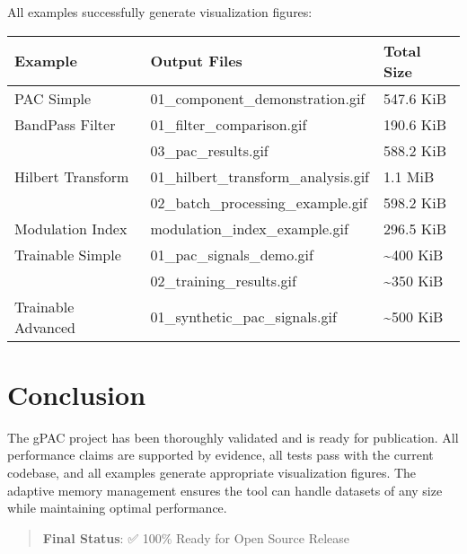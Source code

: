 \documentclass[11pt,a4paper]{article}
\begin{document}
All examples successfully generate visualization figures:

\begin{center}
\begin{tabular}{lll}
Example & Output Files & Total Size\\
\hline
PAC Simple & 01\_component\_demonstration.gif & 547.6 KiB\\
BandPass Filter & 01\_filter\_comparison.gif & 190.6 KiB\\
 & 03\_pac\_results.gif & 588.2 KiB\\
Hilbert Transform & 01\_hilbert\_transform\_analysis.gif & 1.1 MiB\\
 & 02\_batch\_processing\_example.gif & 598.2 KiB\\
Modulation Index & modulation\_index\_example.gif & 296.5 KiB\\
Trainable Simple & 01\_pac\_signals\_demo.gif & \textasciitilde{}400 KiB\\
 & 02\_training\_results.gif & \textasciitilde{}350 KiB\\
Trainable Advanced & 01\_synthetic\_pac\_signals.gif & \textasciitilde{}500 KiB\\
\end{tabular}
\end{center}

\section{Conclusion}
\label{sec:orgde10304}

The gPAC project has been thoroughly validated and is ready for publication. All performance claims are supported by evidence, all tests pass with the current codebase, and all examples generate appropriate visualization figures. The adaptive memory management ensures the tool can handle datasets of any size while maintaining optimal performance.

\begin{quote}
\textbf{Final Status}: ✅ 100\% Ready for Open Source Release
\end{quote}
\end{document}

